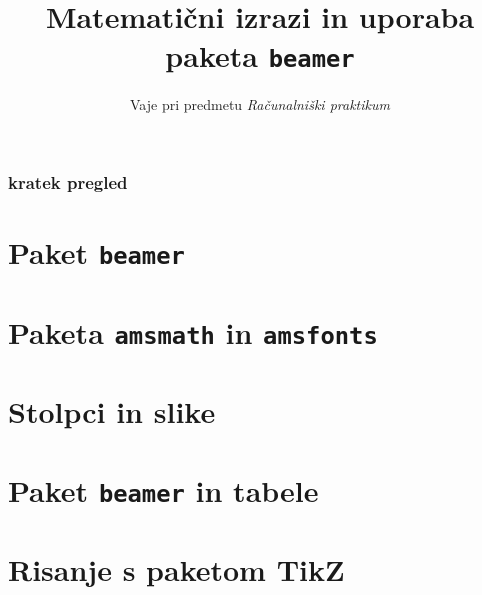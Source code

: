 \documentclass{beamer}
\begin{document}
\title{Matematični izrazi in uporaba paketa \texttt{beamer}}
\subtitle{Vaje pri predmetu \emph{Računalniški praktikum}}
\date{}


\begin{frame}
        \titlepage{}
\end{frame}
\begin{frame}
    \frametitle{kratek pregled}
\end{frame}

\section{Paket \texttt{beamer}}


\section{Paketa \texttt{amsmath} in \texttt{amsfonts}}


\section{Stolpci in slike}


\section{Paket \texttt{beamer} in tabele}


\section{Risanje s paketom TikZ}

\end{document}
